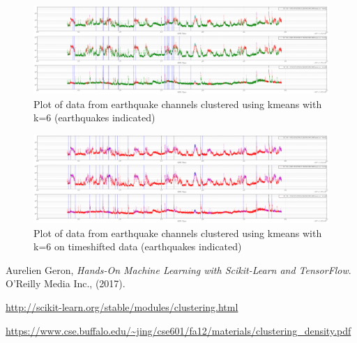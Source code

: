 \documentclass[colorlinks=true,pdfstartview=FitV,linkcolor=blue,
            citecolor=red,urlcolor=magenta]{ligodoc}
\begin{document}
\begin{figure}[htbp]
\begin{center}
\includegraphics[width=1.3\textwidth,angle=90]{Kmeans_all6_.png}
\caption{Plot of data from earthquake channels clustered using kmeans with k=6 (earthquakes indicated)}
\label{fig:image1}
\end{center}
\end{figure}

\begin{figure}[htbp]
\begin{center}
\includegraphics[width=1.3\textwidth,angle=90]{Timeshift_Kmeans_all6_.png}
\caption{Plot of data from earthquake channels clustered using kmeans with k=6 on timeshifted data (earthquakes indicated)}
\label{fig:image2}
\end{center}
\end{figure}

\begin{thebibliography}{9}
      
	  Aurelien Geron,
	  \emph{Hands-On Machine Learning with Scikit-Learn and TensorFlow}.
	 O'Reilly Media Inc., (2017).    
      
         \url{http://scikit-learn.org/stable/modules/clustering.html}

         \url{https://www.cse.buffalo.edu/~jing/cse601/fa12/materials/clustering_density.pdf}
 
\end{thebibliography}
\end{document}

